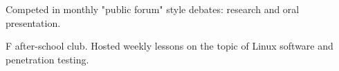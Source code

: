 
\begin{cventries}

  {Competed in monthly "public forum" style debates: research and oral presentation.}
  
  {F after-school club. Hosted weekly lessons on the topic of Linux software and penetration testing. 
 }


\end{cventries}


